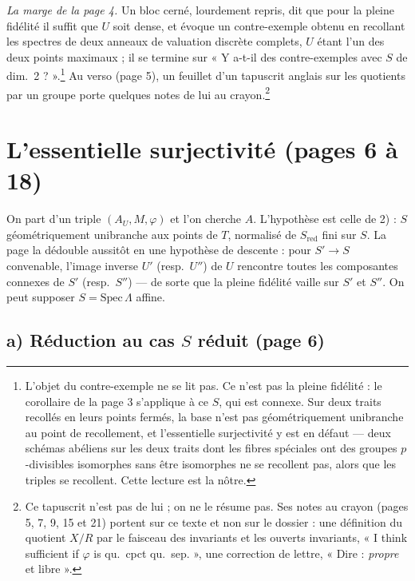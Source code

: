 \documentclass[11pt,a4paper]{article}
\begin{document}
\emph{La marge de la page 4.} Un bloc cerné, lourdement repris, dit que pour la
pleine fidélité il suffit que $U$ soit dense, et évoque un contre-exemple
obtenu en recollant les spectres de deux anneaux de valuation discrète
complets, $U$ étant l'un des deux points maximaux ; il se termine sur « Y
a-t-il des contre-exemples avec $S$ de dim.\ 2 ? ».\footnote{L'objet du
contre-exemple ne se lit pas. Ce n'est pas la pleine fidélité : le corollaire
de la page 3 s'applique à ce $S$, qui est connexe. Sur deux traits recollés en
leurs points fermés, la base n'est pas géométriquement unibranche au point de
recollement, et l'essentielle surjectivité y est en défaut --- deux schémas
abéliens sur les deux traits dont les fibres spéciales ont des groupes
$p$-divisibles isomorphes sans être isomorphes ne se recollent pas, alors que
les triples se recollent. Cette lecture est la nôtre.}
Au verso (page 5), un feuillet d'un tapuscrit anglais sur les quotients par
un groupe porte quelques notes de lui au crayon.\footnote{Ce tapuscrit
n'est pas de lui ; on ne le résume pas. Ses notes au crayon (pages 5, 7, 9,
15 et 21) portent sur ce texte et non sur le dossier : une définition du
quotient $X/R$ par le faisceau des invariants et les ouverts invariants,
« I think sufficient if $\varphi$ is qu.\ cpct qu.\ sep. », une correction de
lettre, « Dire : \emph{propre} et libre ».}

\section*{L'essentielle surjectivité (pages 6 à 18)}

On part d'un triple $(A_U, M, \varphi)$ et l'on cherche $A$. L'hypothèse
est celle de 2) : $S$ géométriquement unibranche aux points de $T$, normalisé
de $S_{\mathrm{red}}$ fini sur $S$. La page la dédouble aussitôt en une
hypothèse de descente : pour $S' \to S$ convenable, l'image inverse $U'$
(resp.\ $U''$) de $U$ rencontre toutes les composantes connexes de $S'$
(resp.\ $S''$) --- de sorte que la pleine fidélité vaille sur $S'$ et $S''$.
On peut supposer $S = \mathrm{Spec}\,\Lambda$ affine.

\subsection*{a) Réduction au cas $S$ réduit (page 6)}
\end{document}

